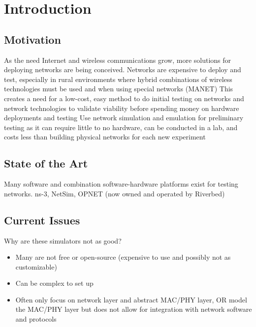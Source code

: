 \chapter{Introduction}
\label{ch:introduction}
\section{Motivation}
As the need Internet and wireless communications grow, more solutions for deploying networks are being conceived. 
Networks are expensive to deploy and test, especially in rural environments where hybrid combinations of wireless technologies must be used and when using special networks (MANET) %
This creates a need for a low-cost, easy method to do initial testing on networks and network technologies to validate viability before spending money on hardware deployments and testing
Use network simulation and emulation for preliminary testing as it can require little to no hardware, can be conducted in a lab, and costs less than building physical networks for each new experiment


\section{State of the Art}
Many software and combination software-hardware platforms exist for testing networks.
ns-3, NetSim, OPNET (now owned and operated by Riverbed)


\section{Current Issues}
Why are these simulators not as good?
\begin{itemize}
    \item Many are not free or open-source (expensive to use and possibly not as customizable) %
    \item Can be complex to set up %
    \item Often only focus on network layer and abstract MAC/PHY layer, OR model the MAC/PHY layer but does not allow for integration with network software and protocols %
\end{itemize}


